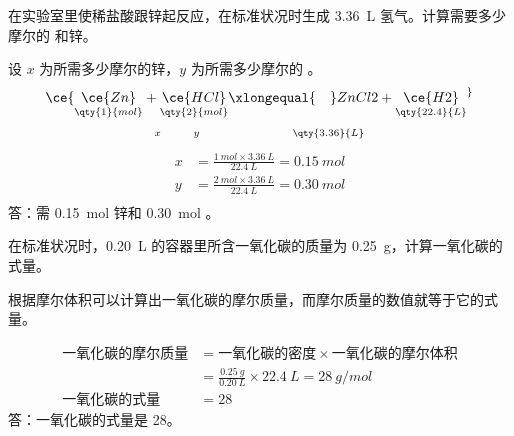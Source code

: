 \begin{example}
  在实验室里使稀盐酸跟锌起反应，在标准状况时生成 \qty{3.36}{L} 氢气。计算需要多少摩尔的  和锌。
\end{example}
\begin{solution}
  设 $x$ 为所需多少摩尔的锌，$y$ 为所需多少摩尔的 。
  \begin{gather*} 
    \ce{\underset{\qty{1}{mol}}{\ce{Zn}} + \underset{\qty{2}{mol}}{\ce{HCl}} \xlongequal{\quad} ZnCl2 + \underset{\qty{22.4}{L}}{\ce{H2}} ^} \\
   \scriptstyle x\quad\quad\ y \qquad\qquad\ \ \qquad \qty{3.36}{L}
  \end{gather*}
  \[\begin{split} 
    x & = \frac{\qty{1}{mol}\times\qty{3.36}{L}}{\qty{22.4}{L}} = \qty{0.15}{mol}\\
    y & = \frac{\qty{2}{mol}\times\qty{3.36}{L}}{\qty{22.4}{L}} = \qty{0.30}{mol}\\
  \end{split}\]
  答：需 \qty{0.15}{mol} 锌和 \qty{0.30}{mol} 。
\end{solution}

\begin{example}
  在标准状况时，\qty{0.20}{L} 的容器里所含一氧化碳的质量为 \qty{0.25}{g}，计算一氧化碳的式量。
\end{example}

根据摩尔体积可以计算出一氧化碳的摩尔质量，而摩尔质量的数值就等于它的式量。

\begin{solution}
  \[\begin{split}
    \text{一氧化碳的摩尔质量} & = \text{一氧化碳的密度} \times \text{一氧化碳的摩尔体积}\\
    & = \frac{\qty{0.25}{g}}{\qty{0.20}{L}} \times \qty{22.4}{L} = \qty{28}{g/mol}\\ 
    \text{一氧化碳的式量} & = 28
  \end{split}\]
  答：一氧化碳的式量是 28。
\end{solution}


